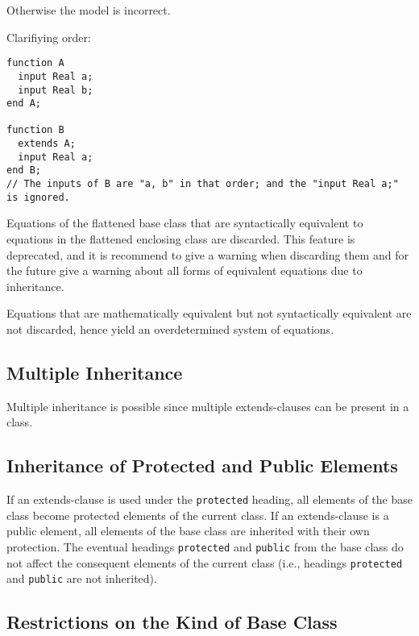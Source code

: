 Otherwise the model is incorrect.

\begin{nonnormative}
Clarifiying order:
\begin{lstlisting}[language=modelica]
function A
  input Real a;
  input Real b;
end A;

function B
  extends A;
  input Real a;
end B;
// The inputs of B are "a, b" in that order; and the "input Real a;" is ignored.
\end{lstlisting}
\end{nonnormative}

Equations of the flattened base class that are syntactically equivalent
to equations in the flattened enclosing class are discarded. This
feature is deprecated, and it is recommend to give a warning when
discarding them and for the future give a warning about all forms of
equivalent equations due to inheritance.

\begin{nonnormative}
Equations that are mathematically equivalent but not syntactically equivalent are not discarded, hence yield an overdetermined system of equations.
\end{nonnormative}

\subsection{Multiple Inheritance}

Multiple inheritance is possible since multiple extends-clauses can be
present in a class.

\subsection{Inheritance of Protected and Public Elements}

If an extends-clause is used under the \lstinline!protected! heading, all elements
of the base class become protected elements of the current class. If an
extends-clause is a public element, all elements of the base class are
inherited with their own protection. The eventual headings \lstinline!protected! and
\lstinline!public! from the base class do not affect the consequent elements of the
current class (i.e., headings \lstinline!protected! and \lstinline!public! are not inherited).

\subsection{Restrictions on the Kind of Base Class}

